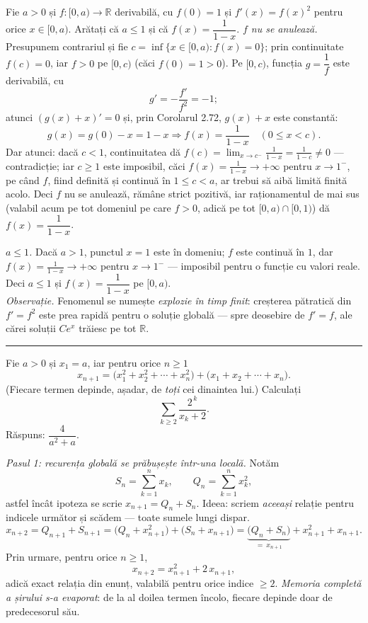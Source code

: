 Fie $a>0$ și $f:[0,a)\to\mathbb{R}$ derivabilă, cu $f(0)=1$ și $f'(x)=f(x)^2$ pentru orice $x\in[0,a)$. Arătați că $a\le1$ și că $f(x)=\dfrac1{1-x}$.
\sol \emph{$f$ nu se anulează.} Presupunem contrariul și fie $c=\inf\{x\in[0,a):f(x)=0\}$; prin continuitate $f(c)=0$, iar $f>0$ pe $[0,c)$ (căci $f(0)=1>0$). Pe $[0,c)$, funcția $g=\dfrac1f$ este derivabilă, cu
\[ g'=-\frac{f'}{f^2}=-1 ; \]
atunci $(g(x)+x)'=0$ și, prin Corolarul 2.72, $g(x)+x$ este constantă:
\[ g(x)=g(0)-x=1-x \Longrightarrow f(x)=\frac1{1-x}\quad(0\le x<c). \]
Dar atunci: dacă $c<1$, continuitatea dă $f(c)=\lim_{x\to c^-}\frac1{1-x}=\frac1{1-c}\neq0$ --- contradicție; iar $c\ge1$ este imposibil, căci $f(x)=\frac1{1-x}\to+\infty$ pentru $x\to1^-$, pe când $f$, fiind definită și continuă în $1\le c<a$, ar trebui să aibă limită finită acolo. Deci $f$ nu se anulează, rămâne strict pozitivă, iar raționamentul de mai sus (valabil acum pe tot domeniul pe care $f>0$, adică pe tot $[0,a)\cap[0,1)$) dă $f(x)=\dfrac1{1-x}$.

\emph{$a\le1$.} Dacă $a>1$, punctul $x=1$ este în domeniu; $f$ este continuă în $1$, dar $f(x)=\frac1{1-x}\to+\infty$ pentru $x\to1^-$ --- imposibil pentru o funcție cu valori reale. Deci $a\le1$ și $f(x)=\dfrac1{1-x}$ pe $[0,a)$.\\[2pt]
\emph{Observație.} Fenomenul se numește \emph{explozie în timp finit}: creșterea pătratică din $f'=f^2$ este prea rapidă pentru o soluție globală --- spre deosebire de $f'=f$, ale cărei soluții $Ce^x$ trăiesc pe tot $\mathbb{R}$.
\vspace{1mm}\hrule

Fie $a>0$ și $x_{1}=a$, iar pentru orice $n\ge1$
\[ x_{n+1}=\bigl(x_{1}^{2}+x_{2}^{2}+\cdots+x_{n}^{2}\bigr)+\bigl(x_{1}+x_{2}+\cdots+x_{n}\bigr) . \]
(Fiecare termen depinde, așadar, de \emph{toți} cei dinaintea lui.) Calculați
\[ \sum_{k\ge2}\frac{2^{\,k}}{x_{k}+2} . \]
\sol Răspuns: $\dfrac{4}{a^{2}+a}$.

\emph{Pasul 1: recurența globală se prăbușește într-una locală.} Notăm
\[ S_{n}=\sum_{k=1}^{n}x_{k},\qquad Q_{n}=\sum_{k=1}^{n}x_{k}^{2} , \]
astfel încât ipoteza se scrie $x_{n+1}=Q_{n}+S_{n}$. Ideea: scriem \emph{aceeași} relație pentru indicele următor și scădem --- toate sumele lungi dispar.
\[ x_{n+2}=Q_{n+1}+S_{n+1}=\bigl(Q_{n}+x_{n+1}^{2}\bigr)+\bigl(S_{n}+x_{n+1}\bigr)=\underbrace{\bigl(Q_{n}+S_{n}\bigr)}_{=\ x_{n+1}}+x_{n+1}^{2}+x_{n+1} . \]
Prin urmare, pentru orice $n\ge1$,
\[ x_{n+2}=x_{n+1}^{2}+2\,x_{n+1} , \]
adică exact relația din enunț, valabilă pentru orice indice $\ge2$. \emph{Memoria completă a șirului s-a evaporat}: de la al doilea termen încolo, fiecare depinde doar de predecesorul său.

